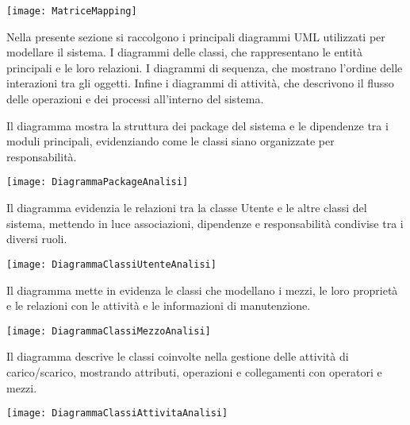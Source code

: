 \documentclass[a4paper]{report}
\begin{document}
\clearpage
{}

\begin{figure*}[!ht]
    \centering
    \texttt{[image: MatriceMapping]}
\end{figure*}

Nella presente sezione si raccolgono i principali diagrammi UML utilizzati per modellare il sistema. I diagrammi delle classi, che rappresentano le entità principali e le loro relazioni. I diagrammi di sequenza, che mostrano l’ordine delle interazioni tra gli oggetti. Infine i diagrammi di attività, che descrivono il flusso delle operazioni e dei processi all’interno del sistema.


Il diagramma mostra la struttura dei package del sistema e le dipendenze tra i moduli principali, evidenziando come le classi siano organizzate per responsabilità.

\begin{figure*}[!ht]
    \centering
    \texttt{[image: DiagrammaPackageAnalisi]}
\end{figure*}

\clearpage
{}
Il diagramma evidenzia le relazioni tra la classe Utente e le altre classi del sistema, mettendo in luce associazioni, dipendenze e responsabilità condivise tra i diversi ruoli.

\begin{figure*}[!ht]
    \centering
    \texttt{[image: DiagrammaClassiUtenteAnalisi]}
\end{figure*}

\clearpage
{}
Il diagramma mette in evidenza le classi che modellano i mezzi, le loro proprietà e le relazioni con le attività e le informazioni di manutenzione.

\begin{figure*}[!ht]
    \centering
    \texttt{[image: DiagrammaClassiMezzoAnalisi]}
\end{figure*}

\clearpage
{}
Il diagramma descrive le classi coinvolte nella gestione delle attività di carico/scarico, mostrando attributi, operazioni e collegamenti con operatori e mezzi.

\begin{figure*}[!ht]
    \centering
    \texttt{[image: DiagrammaClassiAttivitaAnalisi]}
\end{figure*}
\end{document}
